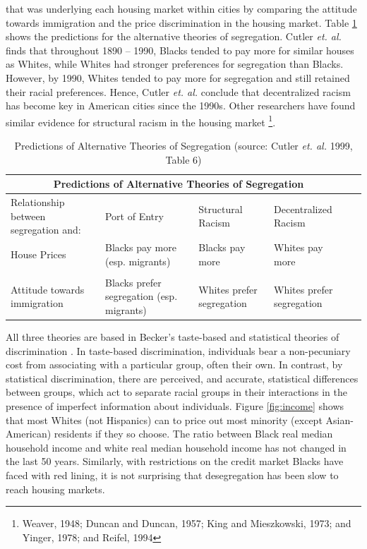 \documentclass[11pt]{asaproc}
\newcommand{\1}{\mathbb{1}}
\begin{document}
that was underlying each housing market within cities by comparing the attitude towards immigration and the price discrimination in the housing market. Table \ref{tab:cutler6} shows the predictions for the alternative theories of segregation. Cutler \textit{et. al.}  finds that throughout 1890 -- 1990, Blacks tended to pay more for similar houses as Whites, while Whites had stronger preferences for segregation than Blacks. However, by 1990, Whites tended to pay more for segregation and still retained their racial preferences. Hence, Cutler \textit{et. al.} conclude that decentralized racism has become key in American cities since the 1990s. Other researchers have found similar evidence for structural racism in the housing market \footnote{Weaver, 1948\citep{weaver48}; Duncan and Duncan, 1957\citep{duncan57}; King and Mieszkowski, 1973\citep{king73}; and Yinger, 1978\citep{yinger78}; and Reifel, 1994\citep{reifel94}}.

\begin{table}[h!]
\begin{tabular}{|p{3cm}||p{3cm}|p{3cm}|p{3cm}|p{3cm}}
\hline
\multicolumn{4}{|c|}{Predictions of Alternative Theories of Segregation}\\ \hline \hline
 Relationship between segregation and: & Port of Entry & Structural Racism & Decentralized Racism\\
 \hline
  House Prices & Blacks pay more (esp. migrants) & Blacks pay more & Whites pay more\\
  & & & \\
   Attitude towards immigration & Blacks prefer segregation (esp. migrants) & Whites prefer segregation & Whites prefer segregation\\
 \hline \hline
\end{tabular}
\caption[Alternative Theories of Segregation]{Predictions of Alternative Theories of Segregation (source: Cutler \textit{et. al.} 1999, Table 6)}
\label{tab:cutler6}
\end{table} 

All three theories are based in Becker's taste-based and statistical theories of discrimination \citep{becker10}. In taste-based discrimination, individuals bear a non-pecuniary cost from associating with a particular group, often their own. In contrast, by statistical discrimination, there are perceived, and accurate, statistical differences between groups, which act to separate racial groups in their interactions in the presence of imperfect information about individuals. Figure \ref{fig:income} shows that most Whites (not Hispanics) can to price out most minority (except Asian-American) residents if they so choose. The ratio between Black real median household income and white real median household income has not changed in the last 50 years. Similarly, with restrictions on the credit market Blacks have faced with red lining, it is not surprising that desegregation has been slow to reach housing markets.
\end{document}
